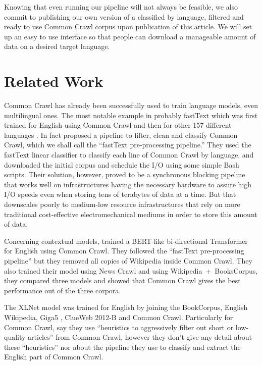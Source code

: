 Knowing that even running our pipeline will not always be feasible, we also commit to publishing our own version of a classified by language, filtered and ready to use Common Crawl corpus upon publication of this article. We will set up an easy to use interface so that people can download a manageable amount of data on a desired target language.

\section{Related Work}

Common Crawl has already been successfully used to train language models, even multilingual ones. The most notable example in probably fastText which was first trained for English using Common Crawl \citep{mikolov-etal-2018-advances} and then for other 157 different languages \citep{Grave:2018}. In fact \citet{Grave:2018} proposed a pipeline to filter, clean and classify Common Crawl, which we shall call the ``fastText pre-processing pipeline.'' They used the fastText linear classifier \citep{Joulin:2016, Joulin:2017} to classify each line of Common Crawl by language, and downloaded the initial corpus and schedule the I/O using some simple Bash scripts. Their solution, however, proved to be a synchronous blocking pipeline that works well on infrastructures having the necessary hardware to assure high I/O speeds even when storing tens of terabytes of data at a time. But that downscales poorly to medium-low resource infrastructures that rely on more traditional cost-effective electromechanical mediums in order to store this amount of data.

Concerning contextual models, \citet{Baevski:2019} trained a BERT-like bi-directional Transformer for English using Common Crawl. They followed the ``fastText pre-processing pipeline'' but they removed all copies of Wikipedia inside Common Crawl. They also trained their model using News Crawl \citep{Bojar:2018} and using Wikipedia~+~BooksCorpus, they compared three models and showed that Common Crawl gives the best performance out of the three corpora.

The XLNet model was trained for English by joining the BookCorpus, English Wikipedia, Giga5 \citep{Parker:2011}, ClueWeb 2012-B \citep{Callan:2009} and Common Crawl. Particularly for Common Crawl, \citet{Yang:2019} say they use ``heuristics to aggressively filter out short or low-quality articles'' from Common Crawl, however they don't give any detail about these ``heuristics'' nor about the pipeline they use to classify and extract the English part of Common Crawl.

